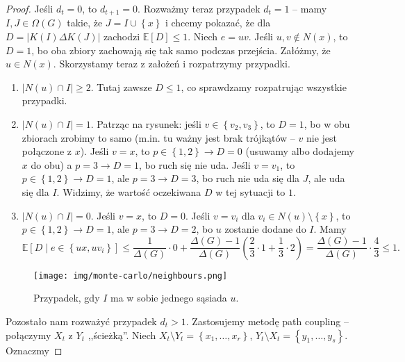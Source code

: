 \begin{proof}
	Jeśli \(d_t = 0\), to \(d_{t+1}=0\). Rozważmy teraz przypadek \(d_t = 1\) -- mamy \(I,J \in \Omega\left( G  \right) \) takie, że \(J = I \cup \left\{ x  \right\} \) i chcemy pokazać, że dla \(D = \left|K\left( I  \right) \Delta K\left( J \right) \right|\) zachodzi \(\mathbb{E}\left[ D  \right] \le 1\). Niech \(e = uv\). Jeśli \(u,v \notin N\left( x  \right) \), to \(D = 1\), bo oba zbiory zachowają się tak samo podczas przejścia. Załóżmy, że \(u \in N\left( x  \right) \). Skorzystamy teraz z założeń i rozpatrzymy przypadki.
	\begin{enumerate}
		\item \(\left|N\left( u  \right) \cap I \right|\ge 2\). Tutaj zawsze \(D \le 1\), co sprawdzamy rozpatrując wszystkie przypadki.
		\item \(\left|N\left( u  \right) \cap I \right|= 1\). Patrząc na rysunek: jeśli \(v \in \left\{ v_2,v_3 \right\} \), to \(D = 1\), bo w obu zbiorach zrobimy to samo (m.in. tu ważny jest brak trójkątów -- \(v\) nie jest połączone z \(x\)). Jeśli \(v = x \), to \(p \in \left\{ 1,2 \right\}  \to  D=0\) (usuwamy albo dodajemy \(x\) do obu) a \(p = 3 \to D = 1\), bo ruch się nie uda. Jeśli \(v = v_1\), to \(p \in \left\{ 1,2 \right\} \to D=1\), ale \(p=3 \to D=3\), bo ruch nie uda się dla \(J\), ale uda się dla \(I\). Widzimy, że wartość oczekiwana  \(D\) w tej sytuacji to \(1\).
		\item \(\left|N\left( u  \right) \cap I \right|=0\). Jeśli \(v=x\), to \(D=0\). Jeśli \(v = v_i\) dla \(v_i \in N\left( u  \right) \setminus \left\{ x \right\} \), to \(p \in \left\{ 1,2 \right\} \to D=1\), ale \(p=3 \to D=2\), bo \(u\) zostanie dodane do \(I\). Mamy
		      \[\mathbb{E}\left[ D \mid e \in \left\{ ux, uv_i \right\}  \right] \le \frac{1}{\Delta\left( G  \right) }\cdot 0 + \frac{\Delta\left( G  \right) -1}{\Delta\left( G  \right) }\left( \frac{2}{3}\cdot 1 + \frac{1}{3}\cdot 2 \right) = \frac{\Delta\left( G  \right) -1}{\Delta\left( G  \right) }\cdot \frac{4}{3}\le 1.\]
	\end{enumerate}
	\begin{figure}[H]
		\centering
		\texttt{[image: img/monte-carlo/neighbours.png]}
		\caption{Przypadek, gdy \(I\) ma w sobie jednego sąsiada \(u\).}
		\label{fig:path-coupling}
	\end{figure}
	Pozostało nam rozważyć przypadek \(d_t > 1\). Zastosujemy metodę path coupling -- połączymy \(X_t\) z \(Y_t\) ,,ścieżką''. Niech \(X_t \setminus Y_t = \left\{ x_1,\ldots,x_r \right\} \), \(Y_t \setminus X_t = \left\{ y_1,\ldots,y_s \right\} \). Oznaczmy

\end{proof}
